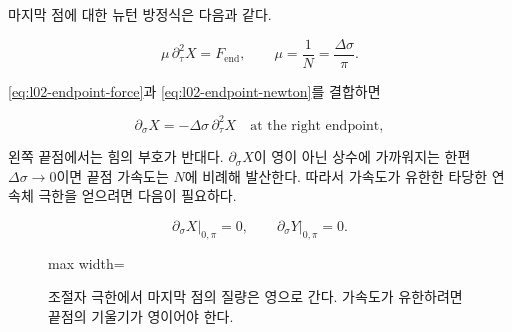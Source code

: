 마지막 점에 대한 뉴턴 방정식은 다음과 같다.

\begin{equation}
  \mu\,\partial_\tau^2X=F_{\mathrm{end}},
  \qquad
  \mu=\frac1N=\frac{\Delta\sigma}{\pi}.
  \label{eq:l02-endpoint-newton}
\end{equation}

\eqref{eq:l02-endpoint-force}과 \eqref{eq:l02-endpoint-newton}를 결합하면

\begin{equation}
  \partial_\sigma X
  =
  -\Delta\sigma\,\partial_\tau^2X
  \quad\text{at the right endpoint},
  \label{eq:l02-endpoint-scaling}
\end{equation}

왼쪽 끝점에서는 힘의 부호가 반대다. \(\partial_\sigma X\)이 영이 아닌 상수에 가까워지는 한편 \(\Delta\sigma\to0\)이면 끝점 가속도는 \(N\)에 비례해 발산한다. 따라서 가속도가 유한한 타당한 연속체 극한을 얻으려면 다음이 필요하다.

\begin{equation}
  \left.\partial_\sigma X\right|_{0,\pi}=0,
  \qquad
  \left.\partial_\sigma Y\right|_{0,\pi}=0.
  \label{eq:l02-open-neumann}
\end{equation}

\begin{figure}[H]
  \centering
  \begin{adjustbox}{max width=\linewidth}
  \end{adjustbox}
  \caption{조절자 극한에서 마지막 점의 질량은 영으로 간다. 가속도가 유한하려면 끝점의 기울기가 영이어야 한다.}
  \label{fig:l02-neumann-redraw}
\end{figure}

